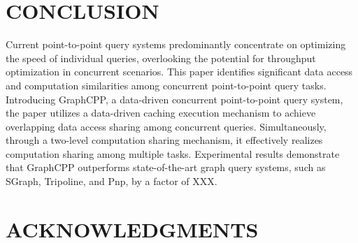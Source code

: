 \documentclass[lettersize,journal]{IEEEtran} %
\begin{document}
\section{CONCLUSION}
Current point-to-point query systems predominantly concentrate on optimizing the speed of individual queries, overlooking the potential for throughput optimization in concurrent scenarios. This paper identifies significant data access and computation similarities among concurrent point-to-point query tasks. Introducing GraphCPP, a data-driven concurrent point-to-point query system, the paper utilizes a data-driven caching execution mechanism to achieve overlapping data access sharing among concurrent queries. Simultaneously, through a two-level computation sharing mechanism, it effectively realizes computation sharing among multiple tasks. Experimental results demonstrate that GraphCPP outperforms state-of-the-art graph query systems, such as SGraph, Tripoline, and Pnp, by a factor of XXX.

\section{ACKNOWLEDGMENTS}
\end{document}
